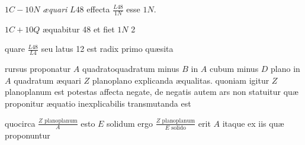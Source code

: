 \documentclass[11pt,a4paper]{article}
\begin{document}
$1C - 10N$ \emph{æquari} $L48$ effecta $\frac{L48}{1N}$ esse $1N$.

$1C + 10Q$ æquabitur 48 et fiet $1N$ 2

quare $\frac{L48}{L4}$ seu latus 12 est radix primo quæsita

rursus proponatur $A$ quadratoquadratum minus $B$ in $A$ cubum minus $D$ plano in $A$ quadratum æquari $Z$ planoplano  explicanda æqualitas. quoniam igitur $Z$ planoplanum est potestas affecta negate, de negatis autem ars non statuitur quæ proponitur æquatio inexplicabilis transmutanda est

quocirca $\frac{Z \text{ planoplanum}}{A}$ esto $E$ solidum ergo $\frac{Z \text{ planoplanum}}{E \text{ solido}}$ erit $A$ itaque ex iis quæ proponuntur
\end{document}
